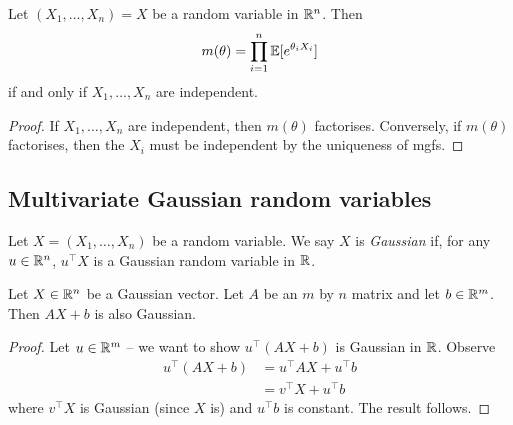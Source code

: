 \documentclass{../../template/note}
\begin{document}
    \begin{proposition}
        Let \((X_1, \dots, X_n) =  X\) be a random variable in \(\mathbb R^n\). Then
        \begin{align*}
            m( \theta) = \prod_{i=1}^n \mathbb E[e^{\theta_i X_i}]
        \end{align*}
        if and only if \(X_1, \dots, X_n\) are independent.        
    \end{proposition}
    
    \begin{proof}
        If \(X_1, \dots, X_n\) are independent, then \(m(\theta)\) factorises. Conversely, if \(m(\theta)\) factorises, then the \(X_i\) must be independent by the uniqueness of mgfs.       
    \end{proof}
    
    \subsection{Multivariate Gaussian random variables}

    \begin{definition}
        Let \(X = (X_1, \dots, X_n)\) be a random variable. We say \(X\) is \emph{Gaussian} if, for any \(u \in \mathbb R^n\), \(u^\intercal X\) is a Gaussian random variable in \(\mathbb R\).
    \end{definition}
    
    \begin{proposition}
        \label{linear-preserves-gaussian}
        Let \(X \in \mathbb R^n\) be a Gaussian vector. Let \(A\) be an \(m\) by \(n\) matrix and let \(b \in \mathbb R^m\). Then \(AX + b\) is also Gaussian.
    \end{proposition}
    
    \begin{proof}
        Let \(u \in \mathbb R^m\) -- we want to show \(u^\intercal (AX + b)\) is Gaussian in \(\mathbb R\). Observe
        \begin{align*}
            u^\intercal(AX + b) &= u^\intercal AX + u^\intercal b \\
            &= v^\intercal X + u^\intercal b
        \end{align*}
        where \(v^\intercal X\) is Gaussian (since \(X\) is) and \(u^\intercal b\) is constant. The result follows.        
    \end{proof}
    
\end{document}
